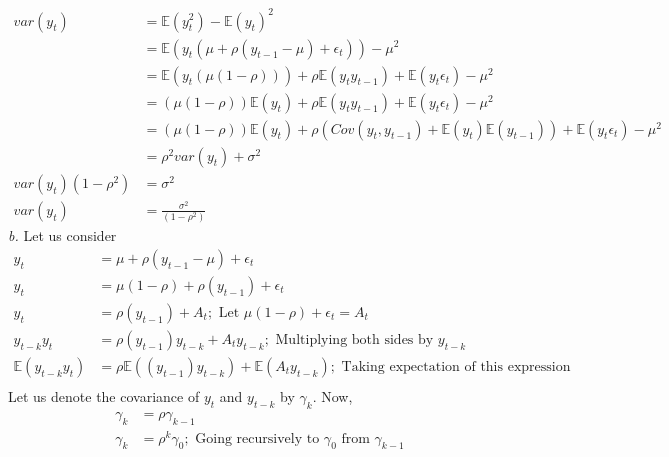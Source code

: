 \documentclass[11pt]{article}
\begin{document}
\begin{equation}
  \nonumber
  \begin{aligned}
    var(y_{t}) & = \mathbb{E}(y_{t}^{2}) - \mathbb{E}(y_{t})^{2}\\
    & = \mathbb{E}(y_{t}(\mu + \rho(y_{t-1} -\mu) + \epsilon_{t})) - \mu^2\\
    & = \mathbb{E}(y_{t}(\mu(1-\rho))) + \rho\mathbb{E}(y_{t}y_{t-1}) + \mathbb{E}(y_{t}\epsilon_{t}) - \mu^2\\
    & = (\mu(1-\rho))\mathbb{E}(y_{t})+ \rho\mathbb{E}(y_{t}y_{t-1}) + \mathbb{E}(y_{t}\epsilon_{t}) - \mu^2\\
    & = (\mu(1-\rho))\mathbb{E}(y_{t})+ \rho(Cov(y_{t}, y_{t-1}) + \mathbb{E}(y_{t})\mathbb{E}(y_{t-1})) + \mathbb{E}(y_{t}\epsilon_{t}) - \mu^2\\
    & = \rho^{2}var(y_{t}) + \sigma^2\\
    var(y_{t})(1-\rho^2) &= \sigma^2\\
    var(y_{t}) & = \frac{\sigma^2}{(1-\rho^2)}
  \end{aligned}
\end{equation}
\emph{b.} Let us consider
\begin{equation}
  \nonumber
  \begin{aligned}
    y_{t} & = \mu + \rho(y_{t-1} -\mu) + \epsilon_{t}\\
    y_{t} & = \mu(1- \rho) + \rho(y_{t-1}) + \epsilon_{t}\\
    y_{t} & = \rho(y_{t-1}) + A_{t}; \text{ Let }\mu(1- \rho) +\epsilon_{t} =  A_{t}\\
    y_{t-k}y_{t} & = \rho(y_{t-1})y_{t-k} + A_{t}y_{t-k}; \text{ Multiplying both sides by }y_{t-k}\\
    \mathbb{E}(y_{t-k}y_{t}) & = \rho\mathbb{E}((y_{t-1})y_{t-k}) + \mathbb{E}(A_{t}y_{t-k}); \text{ Taking expectation of this expression}\\
  \end{aligned}
\end{equation}
Let us denote the covariance of $y_{t}$ and $y_{t-k}$ by $\gamma_{k}$. Now,
\begin{equation}
  \nonumber
  \begin{aligned}
    \gamma_{k} & = \rho\gamma_{k-1}\\
    \gamma_{k} & = \rho^{k}\gamma_{0}; \text{ Going recursively to } \gamma_{0} \text{ from }\gamma_{k-1}\\
  \end{aligned}
\end{equation}
\end{document}
